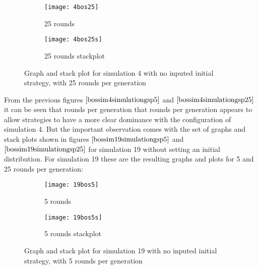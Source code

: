 \begin{figure}[H]       
    \centering
    \begin{subfigure}[b]{0.4\textwidth}
	\centering
	{\texttt{[image: 4bos25]}}   
    	\caption{25 rounds}
	\label{fig:bossim4r25}
    \end{subfigure}
    \hfill
    \begin{subfigure}[b]{0.4\textwidth}
	\centering
	{\texttt{[image: 4bos25s]}}   
    	\caption{25 rounds stackplot}
	\label{fig:bossim4rs25}
    \end{subfigure}
    \caption{Graph and stack plot for simulation 4 with no inputed initial strategy, with 25 rounds per generation}
    \label{bossim4simulationgsp25}
\end{figure}

From the previous figures $\ref{bossim4simulationgsp5}$ and $\ref{bossim4simulationgsp25}$ it can be seen that rounds per generation that rounds per generation appears to allow strategies to have a more clear dominance with the configuration of simulation 4. But the important observation comes with the set of graphs and stack plots shown in figures $\ref{bossim19simulationgsp5}$ and $\ref{bossim19simulationgsp25}$ for simulation 19 without setting an initial distribution.
For simulation 19 these are the resulting graphs and plots for 5 and 25 rounds per generation:
\begin{figure}[H]       
    \centering
    \begin{subfigure}[b]{0.4\textwidth}
	\centering
	{\texttt{[image: 19bos5]}}   
    	\caption{5 rounds}
	\label{fig:bossim19r5}
    \end{subfigure}
    \hfill
    \begin{subfigure}[b]{0.4\textwidth}
	\centering
	{\texttt{[image: 19bos5s]}}   
    	\caption{5 rounds stackplot}
	\label{fig:bossim19rs5}
    \end{subfigure}
    \caption{Graph and stack plot for simulation 19 with no inputed initial strategy, with 5 rounds per generation}
    \label{bossim19simulationgsp5}
\end{figure}

